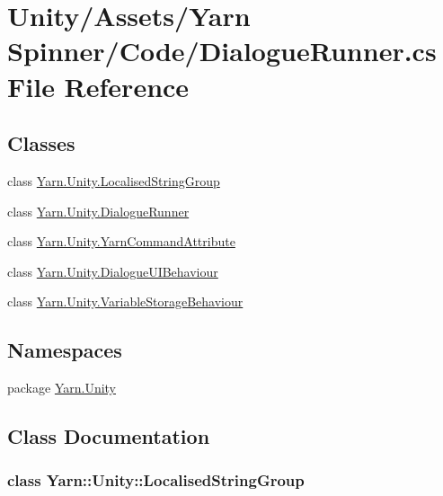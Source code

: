 \hypertarget{a00250}{\section{Unity/\-Assets/\-Yarn Spinner/\-Code/\-Dialogue\-Runner.cs File Reference}
\label{a00250}
}
\subsection*{Classes}
\begin{DoxyCompactItemize}
\item 
class \hyperlink{a00107_d3/db8/a00316}{Yarn.\-Unity.\-Localised\-String\-Group}
\item 
class \hyperlink{a00071}{Yarn.\-Unity.\-Dialogue\-Runner}
\item 
class \hyperlink{a00167}{Yarn.\-Unity.\-Yarn\-Command\-Attribute}
\item 
class \hyperlink{a00073}{Yarn.\-Unity.\-Dialogue\-U\-I\-Behaviour}
\item 
class \hyperlink{a00165}{Yarn.\-Unity.\-Variable\-Storage\-Behaviour}
\end{DoxyCompactItemize}
\subsection*{Namespaces}
\begin{DoxyCompactItemize}
\item 
package \hyperlink{a00107}{Yarn.\-Unity}
\end{DoxyCompactItemize}


\subsection{Class Documentation}
\label{d3/db8/a00316}
\hypertarget{a00107_d3/db8/a00316}{}
\subsubsection{class Yarn\-:\-:Unity\-:\-:Localised\-String\-Group}


